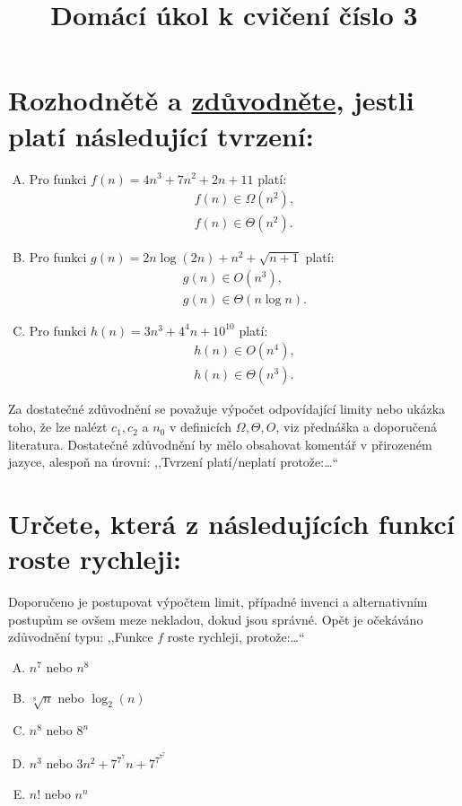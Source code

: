 \documentclass[12pt,oneside]{article}
\title{Domácí úkol k cvičení číslo 3}
\author{\vspace{-1em}}
\begin{document}
	\maketitle
	\section{Rozhodnětě a \underline{zdůvodněte}, jestli platí následující tvrzení:}
	\begin{enumerate}[A)]
		\item Pro funkci $f(n) = 4n^3 + 7n^2 + 2n + 11$ platí:
		\begin{align}
			f(n) \in \Omega(n^2), \\
			f(n) \in \Theta(n^2).
		\end{align}
		\vspace{2cm}
		\item Pro funkci $g(n) = 2n\log(2n) + n^2 + \sqrt{n + 1}$ platí:
		\begin{align}
			g(n) \in O(n^3), \\
			g(n) \in \Theta(n\log n).
		\end{align}
		\vspace{2cm}
		\item Pro funkci $h(n) = 3n^3 + 4^4n + 10^{10} $ platí:
		\begin{align}
			h(n) \in O(n^4) ,\\
			h(n) \in \Theta(n^3).
		\end{align}
	\end{enumerate}
	\vspace{2cm}
	Za dostatečné zdůvodnění se považuje výpočet odpovídající limity nebo ukázka toho, že lze nalézt $c_1, c_2$ a $n_0$ v definicích $\Omega, \Theta, O$, viz přednáška a doporučená literatura.
	Dostatečné zdůvodnění by mělo obsahovat komentář v přirozeném jazyce, alespoň na úrovni: ,,Tvrzení platí/neplatí protože:\dots``

	\section{Určete, která z následujících funkcí roste rychleji:}
	Doporučeno je postupovat výpočtem limit, případné invenci a alternativním postupům se ovšem meze nekladou, dokud jsou správné.
	Opět je očekáváno zdůvodnění typu: ,,Funkce $f$ roste rychleji, protože:\dots``
	\begin{enumerate}[A), itemsep=2.5em]
		\item $n^7$ nebo $n^8$
		\item $\sqrt[8]{n}$ nebo $\log_2(n)$
		\item $n^{8}$ nebo $8^n$
		\item $n^3$ nebo $3n^2 + 7^{7^7}n + 7^{7^{7^7}}$
		\item $n!$ nebo $n^n$
	\end{enumerate}
	\vspace{2.5em}
\end{document}
